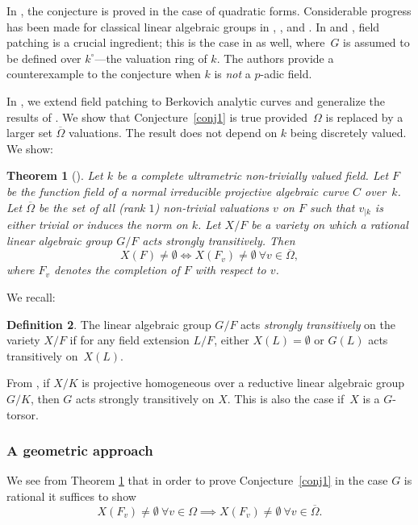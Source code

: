 \documentclass[10pt]{amsart}
\newtheorem{thm}{Theorem}[section]
\theoremstyle{definition}
\newtheorem{defn}[thm]{Definition}
\begin{document}
In \cite{ctps}, the conjecture is proved in the case of quadratic forms.
Considerable progress has been made for classical linear algebraic groups in \cite{parsur}, \cite{wu}, \cite{resur} and \cite{guhsur}. In \cite{ctps} and \cite{parsur}, field patching is a crucial ingredient; this is the case in \cite{cthhkps} as well, where~$G$ is assumed to be defined over $k^{\circ}$---the valuation ring of $k$. The authors provide a counterexample to the conjecture when $k$ is \emph{not} a $p$-adic field.

In \cite{une}, we extend field patching to Berkovich analytic curves and generalize the results of \cite{hhk}. We show that Conjecture~\ref{conj1} is true provided~$\Omega$ is replaced by a larger set $\overline{\Omega}$ valuations. The result does not depend on $k$ being discretely valued. We show:

\begin{thm}[{\cite[Cor.\,3.18]{une}}] \label{theoremval} Let $k$ be a complete ultrametric non-trivially valued field. Let $F$ be the function field of a normal irreducible projective algebraic curve $C$ over~$k$. Let $\overline{\Omega}$ be the set of all (rank $1$) non-trivial valuations $v$ on $F$ such that $v_{|k}$ is either trivial or induces the norm on $k$. Let $X/F$ be a variety on which a rational linear algebraic group $G/F$ acts \emph{strongly transitively}. Then
\[
X(F) \neq \emptyset \iff X(F_v) \neq \emptyset \ \forall v \in \overline{\Omega},
\]
where $F_v$ denotes the completion of $F$ with respect to $v$.
\end{thm}

We recall:

\begin{defn} \label{st}
The linear algebraic group $G/F$ acts \emph{strongly transitively} on the variety $X/F$ if for any field extension $L/F$, either $X(L)=\emptyset$ or $G(L)$ acts transitively on~$X(L)$.
\end{defn}

From \cite[Rem.\,3.9]{hhk}, if $X/K$ is projective homogeneous over a reductive linear algebraic group $G/K$, then $G$ acts strongly transitively on $X$. This is also the case if~$X$ is a $G$-torsor.

\subsubsection*{A geometric approach}
We see from Theorem \ref{theoremval} that in order to prove Conjecture~\ref{conj1} in the case $G$ is rational it suffices to show
\begin{equation}\label{rel1} {X(F_v) \neq \emptyset} \ {\forall v \in \Omega} \implies
X(F_v) \neq \emptyset \ \forall v \in \overline{\Omega}.
\end{equation}
\end{document}
